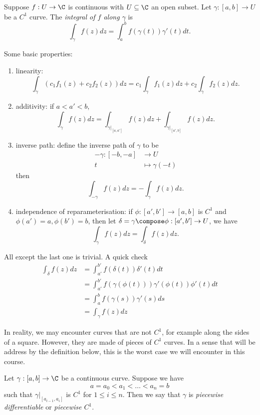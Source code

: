 \documentclass[a4paper]{article}
\begin{document}
\begin{definition}
  Suppose \(f: U \to \C\) is continuous with \(U \subseteq \C\) an open subset. Let \(\gamma: [a, b] \to U\) be a \(C^1\) curve. The \emph{integral of \(f\) along \(\gamma\)} is
  \[
    \int_\gamma f(z)dz = \int_a^b f(\gamma(t))\gamma'(t) dt.
  \]
\end{definition}

Some basic properties:
\begin{enumerate}
\item linearity:
  \[
    \int_\gamma (c_1f_1(z) + c_2f_2(z))dz = c_1 \int_\gamma f_1(z) dz + c_2 \int_\gamma f_2(z) dz.
  \]
\item additivity: if \(a < a' < b\),
  \[
    \int_\gamma f(z)dz = \int_{\gamma|_{[a, a']}} f(z) dz + \int_{\gamma|_{[a', b]}} f(z)dz.
  \]
\item inverse path: define the inverse path of \(\gamma\) to be
  \begin{align*}
    -\gamma: [-b, -a] &\to U \\
    t &\mapsto \gamma(-t)
  \end{align*}
  then
  \[
    \int_{-\gamma} f(z)dz = -\int_\gamma f(z)dz.
  \]
\item independence of reparameterisation: if \(\phi: [a', b'] \to [a, b]\) is \(C^1\) and \(\phi(a') = a, \phi(b') = b\), then let \(\delta = \gamma \compose \phi: [a', b'] \to U\), we have
  \[
    \int_\gamma f(z) dz = \int_\delta f(z)dz.
  \]
\end{enumerate}
All except the last one is trivial. A quick check
\begin{align*}
  \int_\delta f(z)dz &= \int_{a'}^{b'} f(\delta(t))\delta'(t) dt \\
                     &= \int_{a'}^{b'} f(\gamma(\phi(t))) \gamma'(\phi(t)) \phi'(t) dt \\
                     &= \int_a^b f(\gamma(s))\gamma'(s) ds \\
                     &= \int_{\gamma}^{ } f(z) dz
\end{align*}

In reality, we may encounter curves that are not \(C^1\), for example along the sides of a square. However, they are made of pieces of \(C^1\) curves. In a sense that will be address by the definition below, this is the worst case we will encounter in this course.

\begin{definition}[Piecewise \(C^1\)]
 Let \(\gamma: [a, b] \to \C\) be a continuous curve. Suppose we have
\[
  a = a_0 < a_1 < \dots < a_n = b
\]
such that \(\gamma|_{[a_{i - 1}, a_i]}\) is \(C^1\) for \(1 \leq i \leq n\). Then we say that \(\gamma\) is \emph{piecewise differentiable} or \emph{piecewise \(C^1\)}.
\end{definition}
\end{document}
